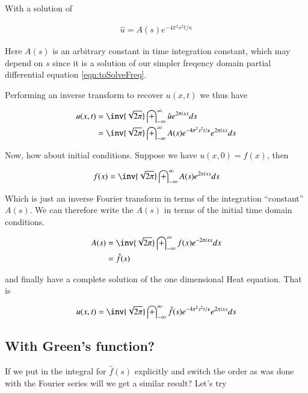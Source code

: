 \documentclass{article}
\newcommand{\IIinf}[0]{ \int_{-\infty}^\infty }
\begin{document}
With a solution of

\begin{align*}
\hat{u} = A(s) e^{ -4 \pi^2 s^2 t/ \kappa }
\end{align*}

Here $A(s)$ is an arbitrary constant in time integration constant, which may depend on $s$ since it is a solution of our simpler freqency domain partial differential equation
\ref{eqn:toSolveFreq}.

Performing an inverse transform to recover $u(x,t)$ we thus have

\begin{align*}
u(x,t) 
&= \inv{\sqrt{2\pi}} \IIinf \hat{u} e^{2 \pi i x s } ds  \\
&= \inv{\sqrt{2\pi}} \IIinf A(s) e^{ -4 \pi^2 s^2 t/ \kappa } e^{2 \pi i x s } ds  \\
\end{align*}

Now, how about initial conditions.  Suppose we have $u(x,0) = f(x)$, then 

\begin{align*}
f(x) &= \inv{\sqrt{2\pi}} \IIinf A(s) e^{2 \pi i x s } ds \\
\end{align*}

Which is just an inverse Fourier transform in terms of the integration ``constant'' $A(s)$.  We can therefore write the $A(s)$ in terms of the
initial time domain conditions.

\begin{align*}
A(s) &= \inv{\sqrt{2\pi}} \IIinf f(x) e^{-2 \pi i s x } dx \\
&= \hat{f}(s)
\end{align*}

and finally have a complete solution of the one dimensional Heat equation.  That is

\begin{align*}
u(x,t) &= \inv{\sqrt{2\pi}} \IIinf \hat{f}(s) e^{ -4 \pi^2 s^2 t/ \kappa } e^{2 \pi i x s } ds  \\
\end{align*}

\subsection{ With Green's function? }

If we put in the integral for $\hat{f}(s)$ explicitly and switch the order as was done with the Fourier series will we get a similar result?   Let's try
\end{document}
